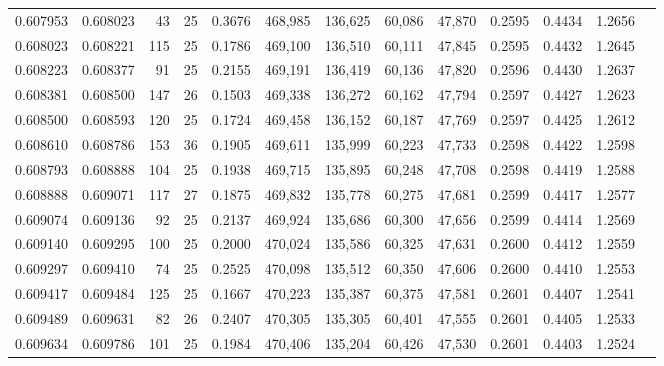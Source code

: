 \begin{tabular}{rrrrrrrrrrrrr}
0.607953 & 0.608023 &    43 &  25 &                                     0.3676 & 468,985 & 136,625 &  60,086 &  47,870 & 0.2595 & 0.4434 & 1.2656 \\
0.608023 & 0.608221 &   115 &  25 &                                     0.1786 & 469,100 & 136,510 &  60,111 &  47,845 & 0.2595 & 0.4432 & 1.2645 \\
0.608223 & 0.608377 &    91 &  25 &                                     0.2155 & 469,191 & 136,419 &  60,136 &  47,820 & 0.2596 & 0.4430 & 1.2637 \\
0.608381 & 0.608500 &   147 &  26 &                                     0.1503 & 469,338 & 136,272 &  60,162 &  47,794 & 0.2597 & 0.4427 & 1.2623 \\
0.608500 & 0.608593 &   120 &  25 &                                     0.1724 & 469,458 & 136,152 &  60,187 &  47,769 & 0.2597 & 0.4425 & 1.2612 \\
0.608610 & 0.608786 &   153 &  36 &                                     0.1905 & 469,611 & 135,999 &  60,223 &  47,733 & 0.2598 & 0.4422 & 1.2598 \\
0.608793 & 0.608888 &   104 &  25 &                                     0.1938 & 469,715 & 135,895 &  60,248 &  47,708 & 0.2598 & 0.4419 & 1.2588 \\
0.608888 & 0.609071 &   117 &  27 &                                     0.1875 & 469,832 & 135,778 &  60,275 &  47,681 & 0.2599 & 0.4417 & 1.2577 \\
0.609074 & 0.609136 &    92 &  25 &                                     0.2137 & 469,924 & 135,686 &  60,300 &  47,656 & 0.2599 & 0.4414 & 1.2569 \\
0.609140 & 0.609295 &   100 &  25 &                                     0.2000 & 470,024 & 135,586 &  60,325 &  47,631 & 0.2600 & 0.4412 & 1.2559 \\
0.609297 & 0.609410 &    74 &  25 &                                     0.2525 & 470,098 & 135,512 &  60,350 &  47,606 & 0.2600 & 0.4410 & 1.2553 \\
0.609417 & 0.609484 &   125 &  25 &                                     0.1667 & 470,223 & 135,387 &  60,375 &  47,581 & 0.2601 & 0.4407 & 1.2541 \\
0.609489 & 0.609631 &    82 &  26 &                                     0.2407 & 470,305 & 135,305 &  60,401 &  47,555 & 0.2601 & 0.4405 & 1.2533 \\
0.609634 & 0.609786 &   101 &  25 &                                     0.1984 & 470,406 & 135,204 &  60,426 &  47,530 & 0.2601 & 0.4403 & 1.2524 \\

\end{tabular}
